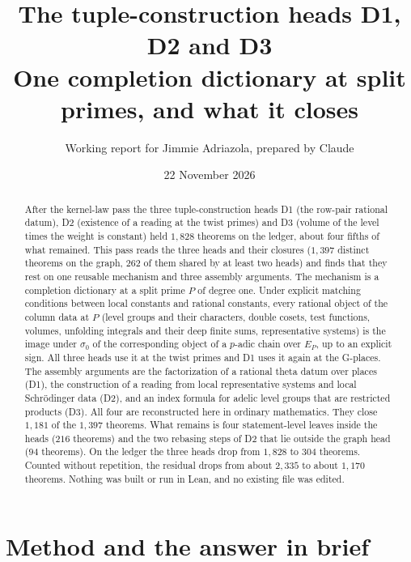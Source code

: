 \documentclass[11pt]{article}
\title{The tuple-construction heads D1, D2 and D3\\ One completion dictionary at split primes, and what it closes}
\author{Working report for Jimmie Adriazola, prepared by Claude}
\date{22 November 2026}
\theoremstyle{definition}
\theoremstyle{remark}
\begin{document}
\maketitle

\begin{abstract}
After the kernel-law pass the three tuple-construction heads D1 (the row-pair rational datum), D2 (existence of a reading at the twist primes) and D3 (volume of the level times the weight is constant) held $1{,}828$ theorems on the ledger, about four fifths of what remained. This pass reads the three heads and their closures ($1{,}397$ distinct theorems on the graph, $262$ of them shared by at least two heads) and finds that they rest on one reusable mechanism and three assembly arguments. The mechanism is a completion dictionary at a split prime $P$ of degree one. Under explicit matching conditions between local constants and rational constants, every rational object of the column data at $P$ (level groups and their characters, double cosets, test functions, volumes, unfolding integrals and their deep finite sums, representative systems) is the image under $\sigma_0$ of the corresponding object of a $p$-adic chain over $E_P$, up to an explicit sign. All three heads use it at the twist primes and D1 uses it again at the G-places. The assembly arguments are the factorization of a rational theta datum over places (D1), the construction of a reading from local representative systems and local Schr\"odinger data (D2), and an index formula for adelic level groups that are restricted products (D3). All four are reconstructed here in ordinary mathematics. They close $1{,}181$ of the $1{,}397$ theorems. What remains is four statement-level leaves inside the heads ($216$ theorems) and the two rebasing steps of D2 that lie outside the graph head ($94$ theorems). On the ledger the three heads drop from $1{,}828$ to $304$ theorems. Counted without repetition, the residual drops from about $2{,}335$ to about $1{,}170$ theorems. Nothing was built or run in Lean, and no existing file was edited.
\end{abstract}

\tableofcontents

\section{Method and the answer in brief}
\end{document}
